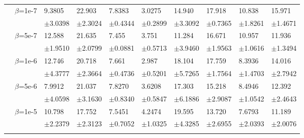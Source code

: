 \documentclass{article}
\begin{document}
\begin{table}[h!]
{\begin{tabularx}{\textwidth}{ccX X X X X X X X}
        & \multirow{2}{*}{$\beta$=1e-7}
        & 9.3805 & 22.903 & 7.8383 & 3.0275 & 14.940 & 17.918 & 10.838 & 15.971\\
        &&\scriptsize$\pm$3.0398 & \scriptsize $\pm$2.3024 & \scriptsize $\pm$0.4344 & \scriptsize $\pm$0.2899 & \scriptsize $\pm$3.3092 & \scriptsize $\pm$0.7365 & \scriptsize $\pm$1.8261 & \scriptsize $\pm$1.4671\\
 

        \cline{3-10}\rule{0pt}{2.3ex}

        & \multirow{2}{*}{$\beta$=5e-7}
        & 12.588 & 21.635 & 7.455 & 3.751 & 11.284 & 16.671 & 10.957 & 11.936\\
        &&\scriptsize$\pm$1.9510 & \scriptsize $\pm$2.0799 & \scriptsize $\pm$0.0881 & \scriptsize $\pm$0.5713 & \scriptsize $\pm$3.9460 & \scriptsize $\pm$1.9563 & \scriptsize $\pm$1.0616 & \scriptsize $\pm$1.3494\\
 

        \cline{3-10}\rule{0pt}{2.3ex}

        & \multirow{2}{*}{$\beta$=1e-6}
        & 12.746 & 20.718 & 7.661 & 2.987 & 18.104 & 17.759 & 8.3936 & 14.016\\
        &&\scriptsize$\pm$4.3777 & \scriptsize $\pm$2.3664 & \scriptsize $\pm$0.4736 & \scriptsize $\pm$0.5201 & \scriptsize $\pm$5.7265 & \scriptsize $\pm$1.7564 & \scriptsize $\pm$1.4703 & \scriptsize $\pm$2.7942\\
 

        \cline{3-10}\rule{0pt}{2.3ex}

        & \multirow{2}{*}{$\beta$=5e-6}
        & 7.9912 & 21.037 & 7.8270 & 3.6208 & 17.303 & 15.218 & 8.4946 & 12.392\\
        &&\scriptsize$\pm$4.0598 & \scriptsize $\pm$3.1630 & \scriptsize $\pm$0.8340 & \scriptsize $\pm$0.5847 & \scriptsize $\pm$6.1886 & \scriptsize $\pm$2.9087 & \scriptsize $\pm$1.0542 & \scriptsize $\pm$2.4643\\

        \cline{3-10}\rule{0pt}{2.3ex}

        & \multirow{2}{*}{$\beta$=1e-5}
        & 10.798 & 17.752 & 7.5451 & 4.2474 & 19.595 & 13.720 & 7.6793 & 11.189\\
        &&\scriptsize$\pm$2.2379 & \scriptsize $\pm$2.3123 & \scriptsize $\pm$0.7052 & \scriptsize $\pm$1.0325 & \scriptsize $\pm$4.3285 & \scriptsize $\pm$2.6955 & \scriptsize $\pm$2.0393 & \scriptsize $\pm$2.0076\\
        \hline \rule{0pt}{2.3ex}
        

\end{tabularx}}
\end{table}
\end{document}
